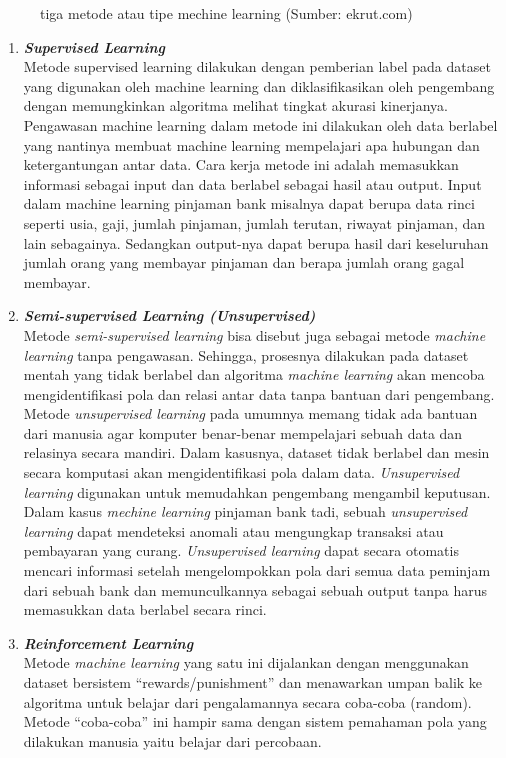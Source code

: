 \begin{enumerate}
\begin{figure} [ht]
      \caption{tiga metode atau tipe mechine learning (Sumber: ekrut.com)}
      \label{fig:OrganizationStructure}
    \end{figure}
    \begin{enumerate}[nolistsep]
      \item \textit{\textbf{Supervised Learning}}\\
        Metode supervised learning dilakukan dengan pemberian label pada dataset  yang digunakan oleh machine learning dan diklasifikasikan oleh pengembang dengan memungkinkan algoritma melihat tingkat akurasi kinerjanya. Pengawasan machine learning dalam metode ini dilakukan oleh data berlabel yang nantinya membuat machine learning mempelajari apa hubungan dan ketergantungan antar data.
        Cara kerja metode ini adalah memasukkan informasi sebagai input dan data berlabel sebagai hasil atau output. Input dalam machine learning pinjaman bank misalnya dapat berupa data rinci seperti usia, gaji, jumlah pinjaman, jumlah terutan, riwayat pinjaman, dan lain sebagainya. Sedangkan output-nya dapat berupa hasil dari keseluruhan jumlah orang yang membayar pinjaman dan berapa jumlah orang gagal membayar.
      \item \textit{\textbf{Semi-supervised Learning (Unsupervised)}} \\
        Metode \textit{semi-supervised learning} bisa disebut juga sebagai metode \textit{machine learning} tanpa pengawasan. Sehingga, prosesnya dilakukan pada dataset mentah yang tidak berlabel dan algoritma \textit{machine learning} akan mencoba mengidentifikasi pola dan relasi antar data tanpa bantuan dari pengembang.
        Metode \textit{unsupervised learning} pada umumnya memang tidak ada bantuan dari manusia agar komputer benar-benar mempelajari sebuah data dan relasinya secara mandiri. Dalam kasusnya, dataset tidak berlabel dan mesin secara komputasi akan mengidentifikasi pola dalam data. \textit{Unsupervised learning} digunakan untuk memudahkan pengembang mengambil keputusan.
        Dalam kasus \textit{mechine learning} pinjaman bank tadi, sebuah \textit{unsupervised learning} dapat mendeteksi anomali atau mengungkap transaksi atau pembayaran yang curang. \textit{Unsupervised learning}  dapat secara otomatis mencari informasi setelah mengelompokkan pola dari semua data peminjam dari sebuah bank dan memunculkannya sebagai sebuah output tanpa harus memasukkan data berlabel secara rinci.
      \item \textit{\textbf{Reinforcement Learning}} \\
        Metode \textit{machine learning} yang satu ini dijalankan dengan menggunakan dataset bersistem “rewards/punishment” dan menawarkan umpan balik ke algoritma untuk belajar dari pengalamannya secara coba-coba (random). Metode “coba-coba” ini hampir sama dengan sistem pemahaman pola yang dilakukan manusia yaitu belajar dari percobaan.


\end{enumerate}
\end{enumerate}
